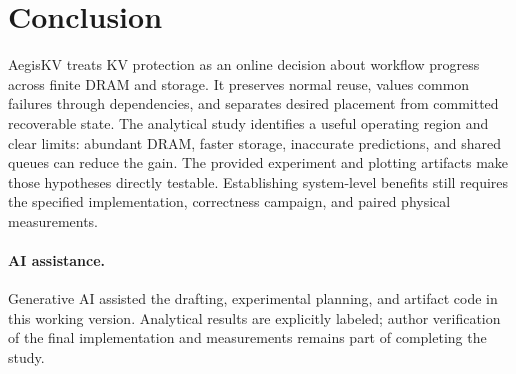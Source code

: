 \documentclass[sigplan,10pt,anonymous,nonacm]{acmart}
\begin{document}
\section{Conclusion}
\label{sec:conclusion}

AegisKV treats KV protection as an online decision about workflow progress
across finite DRAM and storage. It preserves normal reuse, values common
failures through dependencies, and separates desired placement from
committed recoverable state. The analytical study identifies a useful
operating region and clear limits: abundant DRAM, faster storage, inaccurate
predictions, and shared queues can reduce the gain. The provided experiment
and plotting artifacts make those hypotheses directly testable. Establishing
system-level benefits still requires the specified implementation,
correctness campaign, and paired physical measurements.

\paragraph{AI assistance.}
Generative AI assisted the drafting, experimental planning, and artifact
code in this working version. Analytical results are explicitly labeled;
author verification of the final implementation and measurements remains
part of completing the study.



\end{document}
